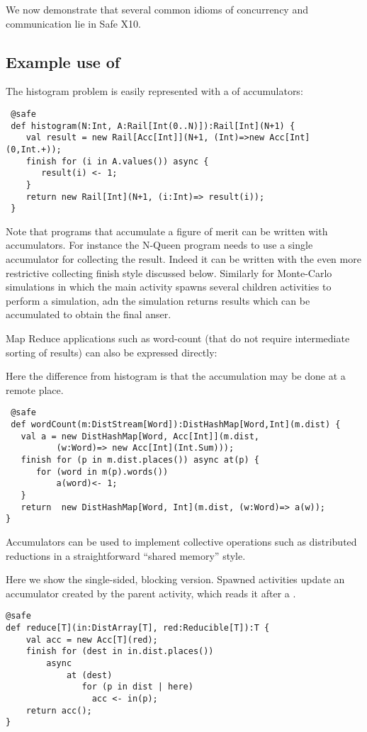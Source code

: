 We now demonstrate that several common idioms of concurrency and
communication lie in Safe X10.

\subsection{Example use of }
\begin{example}[Histogram]
The histogram problem is easily represented with a  of
accumulators: 
\begin{lstlisting}
 @safe
 def histogram(N:Int, A:Rail[Int(0..N)]):Rail[Int](N+1) {
    val result = new Rail[Acc[Int]](N+1, (Int)=>new Acc[Int](0,Int.+));
    finish for (i in A.values()) async {
       result(i) <- 1;
    }
    return new Rail[Int](N+1, (i:Int)=> result(i));
 }
\end{lstlisting}
\end{example}
Note that programs that accumulate a figure of merit can be written
with accumulators. For instance the N-Queen program needs to use a
single accumulator for collecting the result. Indeed it can be written
with the even more restrictive collecting finish style discussed
below. Similarly for Monte-Carlo simulations in which the main
activity spawns several children activities to perform a simulation,
adn the simulation returns results which can be accumulated to
obtain the final anser.

Map Reduce applications such as word-count (that do not require
intermediate sorting of results) can also be expressed directly:
\begin{example}
Here the difference from histogram is that the accumulation may be
done at a remote place. 
\begin{lstlisting}
 @safe
 def wordCount(m:DistStream[Word]):DistHashMap[Word,Int](m.dist) {
   val a = new DistHashMap[Word, Acc[Int]](m.dist,
          (w:Word)=> new Acc[Int](Int.Sum)));
   finish for (p in m.dist.places()) async at(p) {
      for (word in m(p).words())
          a(word)<- 1;
   }
   return  new DistHashMap[Word, Int](m.dist, (w:Word)=> a(w));
}
\end{lstlisting}

\end{example}


Accumulators can be used to implement collective operations such as
distributed reductions in a straightforward ``shared memory'' style.

\begin{example}[Reduction]
Here we show the single-sided, blocking version. Spawned activities
update an accumulator created by the parent activity, which reads it
after a . 
  \begin{lstlisting}
@safe
def reduce[T](in:DistArray[T], red:Reducible[T]):T {
    val acc = new Acc[T](red);
    finish for (dest in in.dist.places())
        async
            at (dest) 
               for (p in dist | here)
                 acc <- in(p);
    return acc();
}
\end{lstlisting}
\end{example}


